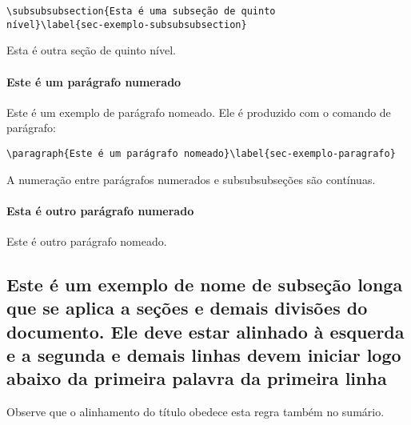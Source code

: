 \begin{verbatim}
\subsubsubsection{Esta é uma subseção de quinto
nível}\label{sec-exemplo-subsubsubsection}
\end{verbatim}

\label{sec-exemplo-subsubsubsection-outro}

Esta é outra seção de quinto nível.


\paragraph{Este é um parágrafo numerado}\label{sec-exemplo-paragrafo}

Este é um exemplo de parágrafo nomeado. Ele é produzido com o comando de
parágrafo:

\begin{verbatim}
\paragraph{Este é um parágrafo nomeado}\label{sec-exemplo-paragrafo}
\end{verbatim}

A numeração entre parágrafos numerados e subsubsubseções são contínuas.

\paragraph{Esta é outro parágrafo numerado}\label{sec-exemplo-paragrafo-outro}

Este é outro parágrafo nomeado.

\subsection{Este é um exemplo de nome de subseção longa que se aplica a seções e demais divisões do documento. Ele deve estar alinhado à esquerda e a segunda e demais linhas devem iniciar logo abaixo da primeira palavra da primeira linha} 

Observe que o alinhamento do título obedece esta regra também no sumário.
	






